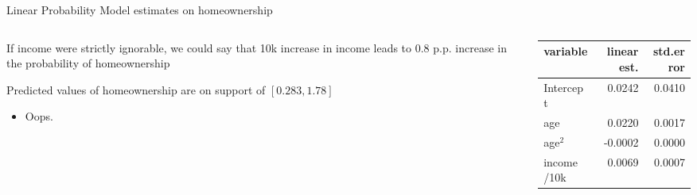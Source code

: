 \documentclass[notes,11pt, aspectratio=169]{beamer}
\newenvironment{wideitemize}{\itemize\addtolength{\itemsep}{10pt}}{\enditemize}
\begin{document}
\begin{frame}{Linear Probability Model estimates on homeownership}
  \begin{columns}[T] %
    \begin{column}{.4\textwidth}
      \begin{wideitemize}
      \item If income were strictly ignorable, we could say that 10k
        increase in income leads to 0.8 p.p. increase in the
        probability of homeownership
      \item Predicted values of homeownership are on support of
        $[0.283, 1.78]$
        \begin{itemize}
        \item Oops.
        \end{itemize}
      \end{wideitemize}
    \end{column}%
  \hfill%
  \begin{column}{.6\textwidth}
    \begin{tabular}{lrr}
      variable &  linear est.  &  std.error\\
      \midrule
      Intercept & 0.0242 &   0.0410\\
      age&   0.0220 &   0.0017\\
      age$^2$&  -0.0002 &   0.0000\\
      income /10k&   0.0069    & 0.0007\\
      \end{tabular}
  \end{column}
\end{columns}
\end{frame}
\end{document}
